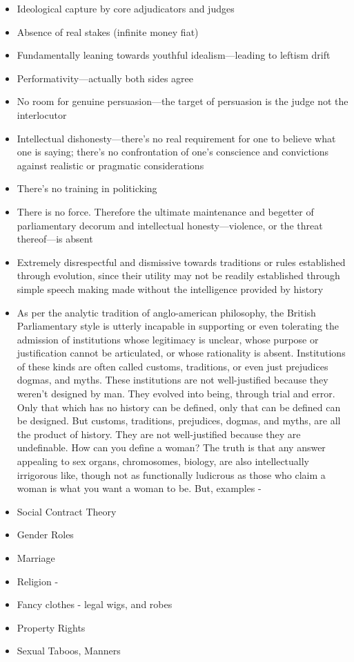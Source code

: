 \begin{itemize}
    \item Ideological capture by core adjudicators and judges
    \item Absence of real stakes (infinite money fiat)
    \item Fundamentally leaning towards youthful idealism—leading to leftism drift
    \item Performativity—actually both sides agree 
    \item No room for genuine persuasion—the target of persuasion is the judge not the interlocutor
    \item Intellectual dishonesty—there's no real requirement for one to believe what one is saying; there's no confrontation of one's conscience and convictions against realistic or pragmatic considerations
    \item There's no training in politicking
    \item There is no force. Therefore the ultimate maintenance and begetter of parliamentary decorum and intellectual honesty—violence, or the threat thereof—is absent
    \item Extremely disrespectful and dismissive towards traditions or rules established through evolution, since their utility may not be readily established through simple speech making made without the intelligence provided by history 
    \item As per the analytic tradition of anglo-american philosophy, the British Parliamentary style is utterly incapable in supporting or even tolerating the admission of institutions whose legitimacy is unclear, whose purpose or justification cannot be articulated, or whose rationality is absent. Institutions of these kinds are often called customs, traditions, or even just prejudices dogmas, and myths. These institutions are not well-justified because they weren't designed by man. They evolved into being, through trial and error. Only that which has no history can be defined, only that can be defined can be designed. But customs, traditions, prejudices, dogmas, and myths, are all the product of history. They are not well-justified because they are undefinable. How can you define a woman? The truth is that any answer appealing to sex organs, chromosomes, biology, are also intellectually irrigorous like, though not as functionally ludicrous as those who claim a woman is what you want a woman to be. But, examples - 
    \item Social Contract Theory 
    \item Gender Roles 
    \item Marriage
    \item Religion -
    \item Fancy clothes - legal wigs, and robes 
    \item Property Rights 
    \item Sexual Taboos, Manners
    

\end{itemize}
